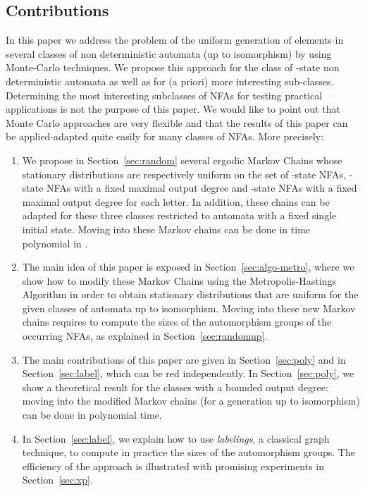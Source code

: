 \subsection{Contributions}
In this paper we address the problem of the uniform generation of elements
in several classes of non deterministic automata (up to isomorphism) by
using Monte-Carlo techniques. We propose this approach for the class of
-state non deterministic automata as well as for (a priori) more
interesting sub-classes. Determining the most interesting subclasses of NFAs
for testing practical applications is not the purpose of this paper. We
would like to point out that Monte Carlo approaches are very flexible and
that the results of this paper can be applied-adapted quite easily for many
classes of NFAs. More precisely:
\begin{enumerate}
\item We propose in Section~\ref{sec:random} several ergodic Markov Chains
whose stationary distributions are respectively uniform on the set of
-state NFAs, -state NFAs with a fixed maximal output degree and
-state NFAs with a fixed maximal output degree for each letter. In
addition, these chains can be adapted for these three classes restricted to
automata with a fixed single initial state. Moving into these Markov chains
can be done in time polynomial in .
\item The main idea of this paper is exposed in
Section~\ref{sec:algo-metro}, where we show how to modify these Markov
Chains using the Metropolis-Hastings Algorithm in order to obtain stationary
distributions that are uniform for the given classes of automata up to
isomorphism. Moving into these new Markov chains requires to compute the sizes
of the automorphism groups of the occurring NFAs, as explained in Section~\ref{sec:randomup}. 

\item The main contributions of this paper are given in
Section~\ref{sec:poly} and in Section~\ref{sec:label}, which can be
red independently. In Section~\ref{sec:poly}, we show a theoretical result for
the classes with a bounded output degree: moving into the modified Markov chains
(for a generation up to isomorphism) can be done in polynomial time. 

\item 
In Section~\ref{sec:label}, we explain how to use {\it labelings}, a classical
graph technique, to compute in practice the sizes of the automorphism
groups. The efficiency of the approach is illustrated with promising
experiments in Section~\ref{sec:xp}.
\end{enumerate}







